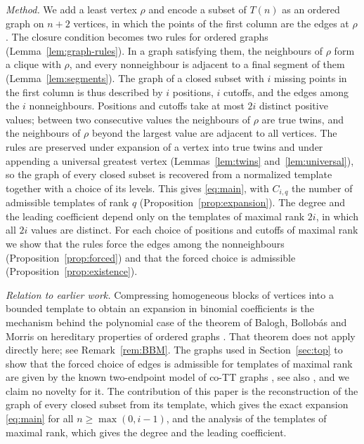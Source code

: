 \documentclass[11pt]{amsart}
\theoremstyle{definition}
\theoremstyle{remark}
\numberwithin{equation}{section}
\begin{document}
\emph{Method.} We add a least vertex $\rho$ and encode a subset of $T(n)$ as an ordered graph on $n+2$ vertices, in which the points of the first column are the edges at $\rho$. The closure condition becomes two rules for ordered graphs (Lemma~\ref{lem:graph-rules}). In a graph satisfying them, the neighbours of $\rho$ form a clique with $\rho$, and every nonneighbour is adjacent to a final segment of them (Lemma~\ref{lem:segments}). The graph of a closed subset with $i$ missing points in the first column is thus described by $i$ positions, $i$ cutoffs, and the edges among the $i$ nonneighbours. Positions and cutoffs take at most $2i$ distinct positive values; between two consecutive values the neighbours of $\rho$ are true twins, and the neighbours of $\rho$ beyond the largest value are adjacent to all vertices. The rules are preserved under expansion of a vertex into true twins and under appending a universal greatest vertex (Lemmas~\ref{lem:twins} and~\ref{lem:universal}), so the graph of every closed subset is recovered from a normalized template together with a choice of its levels. This gives \eqref{eq:main}, with $C_{i,q}$ the number of admissible templates of rank $q$ (Proposition~\ref{prop:expansion}). The degree and the leading coefficient depend only on the templates of maximal rank $2i$, in which all $2i$ values are distinct. For each choice of positions and cutoffs of maximal rank we show that the rules force the edges among the nonneighbours (Proposition~\ref{prop:forced}) and that the forced choice is admissible (Proposition~\ref{prop:existence}).

\emph{Relation to earlier work.} Compressing homogeneous blocks of vertices into a bounded template to obtain an expansion in binomial coefficients is the mechanism behind the polynomial case of the theorem of Balogh, Bollob\'as and Morris on hereditary properties of ordered graphs \cite[Theorem~1(b) and Theorem~12]{BBM}. That theorem does not apply directly here; see Remark~\ref{rem:BBM}. The graphs used in Section~\ref{sec:top} to show that the forced choice of edges is admissible for templates of maximal rank are given by the known two-endpoint model of co-TT graphs \cite{GWL}, see also \cite[Section~1]{HHMR}, and we claim no novelty for it. The contribution of this paper is the reconstruction of the graph of every closed subset from its template, which gives the exact expansion \eqref{eq:main} for all $n\ge\max(0,i-1)$, and the analysis of the templates of maximal rank, which gives the degree and the leading coefficient.
\end{document}
